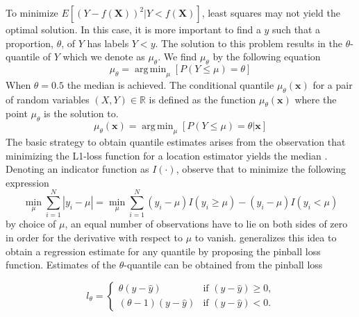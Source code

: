 \documentclass[twoside,11pt]{article}
\begin{document}
To minimize $E[(Y-f(\mathbf{X}))^2|Y<f(\mathbf{X})]$, least squares may not yield the optimal solution. In this case, it is more important to find a $y$ such that a proportion, $\theta$, of $Y$ has labels $Y<y$. The solution to this problem results in the $\theta$-quantile of $Y$ which we denote as $\mu_{\theta}$. We find $\mu_{\theta}$ by the following equation
 \begin{equation}
 \mu_{\theta}=\operatorname{arg\,min}_{\mu}[P(Y\leq \mu)=\theta]
 \end{equation}
When $\theta = 0.5$ the median is achieved. The conditional quantile $\mu_{\theta}(\mathbf{x})$ for a pair of random variables $(X,Y) \in \mathbb{R}$ is defined as the function $\mu_{\theta}(\mathbf{x}) $ where the point $\mu_{\theta}$ is the solution to.
 \begin{equation}
\mu_{\theta}(\mathbf{x})=\operatorname{arg\,min}_{\mu}[P(Y\leq \mu)=\theta|\mathbf{x}]
 \end{equation}
The basic strategy to obtain quantile estimates arises from the observation that minimizing the L1-loss function for a location estimator yields the median \citep{Hao07}. Denoting an indicator function as $I(\cdot)$, observe that to minimize the following expression
\begin{equation}\label{Eq:median minimize}
\min_{\mu}\sum_{i=1}^{N}|y_i-\mu|=\min_{\mu}\sum_{i=1}^{N}(y_i-\mu)I(y_i \geq \mu) - (y_i-\mu)I(y_i < \mu) 
 \end{equation}
by choice of $\mu$, an equal number of observations have to lie on both sides of zero in order for the derivative with respect to $\mu$ to vanish. \citet{Koenker01} generalizes this idea to obtain a regression estimate for any quantile by proposing the pinball loss function. Estimates of the $\theta$-quantile can be obtained from the pinball loss

\begin{equation}\label{Eq:pinball}
l_{\theta}=
\begin{cases} \theta (y-\hat{y}) & \text{if $(y-\hat{y})\geq 0$,}
\\
 (\theta - 1) (y-\hat{y})  &\text{if $(y-\hat{y})< 0$.}
\end{cases}
\end{equation}
\end{document}
